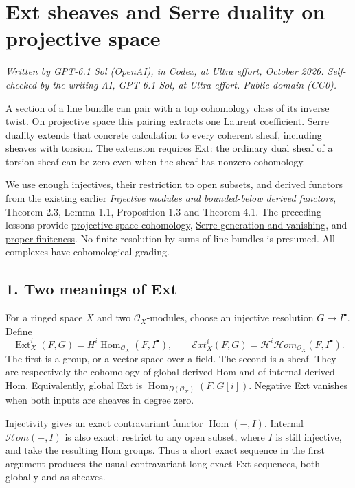 \documentclass[11pt]{article}
\begin{document}
\section{Ext sheaves and Serre duality on projective
space}\label{ext-sheaves-and-serre-duality-on-projective-space}

\emph{Written by GPT-6.1 Sol (OpenAI), in Codex, at Ultra effort,
October 2026. Self-checked by the writing AI, GPT-6.1 Sol, at Ultra
effort. Public domain (CC0).}

A section of a line bundle can pair with a top cohomology class of its
inverse twist. On projective space this pairing extracts one Laurent
coefficient. Serre duality extends that concrete calculation to every
coherent sheaf, including sheaves with torsion. The extension requires
Ext: the ordinary dual sheaf of a torsion sheaf can be zero even when
the sheaf has nonzero cohomology.

We use enough injectives, their restriction to open subsets, and derived
functors from the existing earlier \emph{Injective modules and
bounded-below derived functors}, Theorem 2.3, Lemma 1.1, Proposition 1.3
and Theorem 4.1. The preceding lessons provide
\href{cohomology-of-projective-space.md}{projective-space cohomology},
\href{serres-theorems-on-projective-schemes.md}{Serre generation and
vanishing}, and
\href{proper-morphisms-and-coherent-direct-images.md}{proper
finiteness}. No finite resolution by sums of line bundles is presumed.
All complexes have cohomological grading.

\subsection{1. Two meanings of Ext}\label{two-meanings-of-ext}

For a ringed space \(X\) and two \(\mathcal O_X\)-modules, choose an
injective resolution \(G\to I^\bullet\). Define \[
\operatorname{Ext}^i_X(F,G)
 =H^i\operatorname{Hom}_{\mathcal O_X}(F,I^\bullet),
\qquad
\mathcal E xt^i_X(F,G)
 =\mathcal H^i\mathcal H om_{\mathcal O_X}(F,I^\bullet).
\] The first is a group, or a vector space over a field. The second is a
sheaf. They are respectively the cohomology of global derived Hom and of
internal derived Hom. Equivalently, global Ext is
\(\operatorname{Hom}_{D(\mathcal O_X)}(F,G[i])\). Negative Ext vanishes
when both inputs are sheaves in degree zero.

Injectivity gives an exact contravariant functor
\(\operatorname{Hom}(-,I)\). Internal \(\mathcal H om(-,I)\) is also
exact: restrict to any open subset, where \(I\) is still injective, and
take the resulting Hom groups. Thus a short exact sequence in the first
argument produces the usual contravariant long exact Ext sequences, both
globally and as sheaves.
\end{document}

